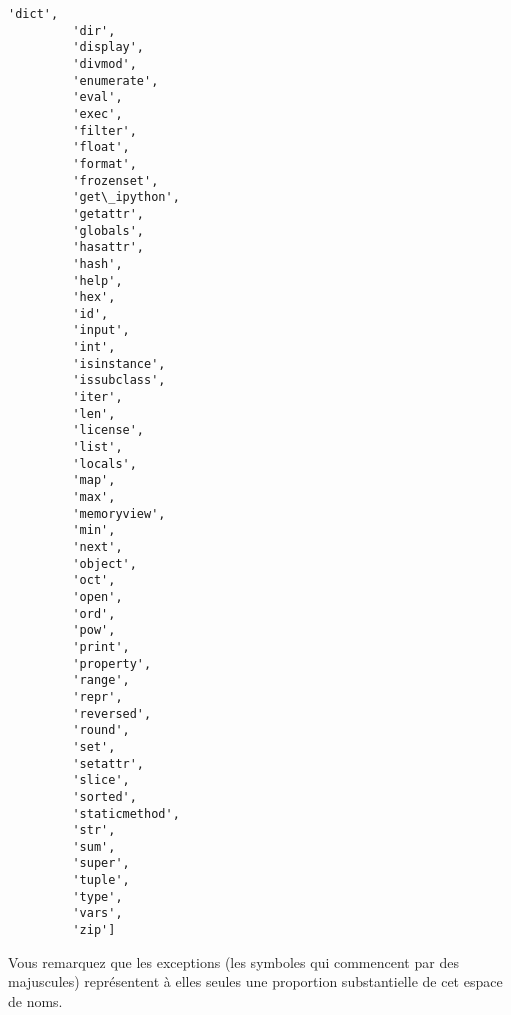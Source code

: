 \begin{Verbatim}[commandchars=\\\{\}]
         'dict',
         'dir',
         'display',
         'divmod',
         'enumerate',
         'eval',
         'exec',
         'filter',
         'float',
         'format',
         'frozenset',
         'get\_ipython',
         'getattr',
         'globals',
         'hasattr',
         'hash',
         'help',
         'hex',
         'id',
         'input',
         'int',
         'isinstance',
         'issubclass',
         'iter',
         'len',
         'license',
         'list',
         'locals',
         'map',
         'max',
         'memoryview',
         'min',
         'next',
         'object',
         'oct',
         'open',
         'ord',
         'pow',
         'print',
         'property',
         'range',
         'repr',
         'reversed',
         'round',
         'set',
         'setattr',
         'slice',
         'sorted',
         'staticmethod',
         'str',
         'sum',
         'super',
         'tuple',
         'type',
         'vars',
         'zip']
\end{Verbatim}
            
    Vous remarquez que les exceptions (les symboles qui commencent par des
majuscules) représentent à elles seules une proportion substantielle de
cet espace de noms.


    
    
    
